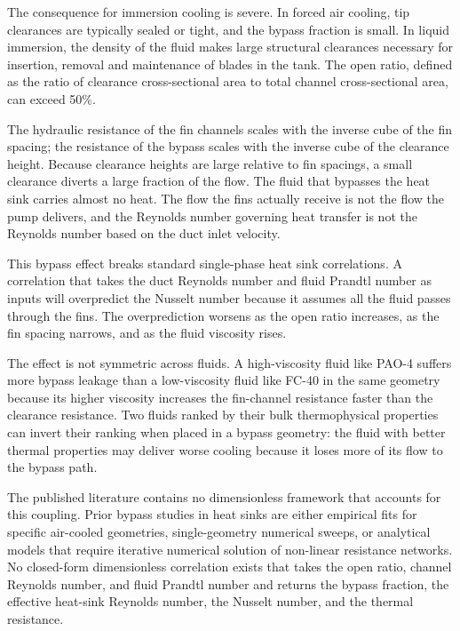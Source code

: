 \documentclass[preprint,12pt]{elsarticle}
\begin{document}
The consequence for immersion cooling is severe. In forced air cooling, tip clearances are
typically sealed or tight, and the bypass fraction is small. In liquid immersion, the density of
the fluid makes large structural clearances necessary for insertion, removal and maintenance of
blades in the tank. The open ratio, defined as the ratio of clearance cross-sectional area to
total channel cross-sectional area, can exceed 50\%.

The hydraulic resistance of the fin channels scales with the inverse cube of the fin spacing;
the resistance of the bypass scales with the inverse cube of the clearance height. Because
clearance heights are large relative to fin spacings, a small clearance diverts a large fraction
of the flow. The fluid that bypasses the heat sink carries almost no heat. The flow the fins
actually receive is not the flow the pump delivers, and the Reynolds number governing heat
transfer is not the Reynolds number based on the duct inlet velocity.

This bypass effect breaks standard single-phase heat sink correlations. A correlation that
takes the duct Reynolds number and fluid Prandtl number as inputs will overpredict the Nusselt
number because it assumes all the fluid passes through the fins. The overprediction worsens as
the open ratio increases, as the fin spacing narrows, and as the fluid viscosity rises.

The effect is not symmetric across fluids. A high-viscosity fluid like PAO-4 suffers more
bypass leakage than a low-viscosity fluid like FC-40 in the same geometry because its higher
viscosity increases the fin-channel resistance faster than the clearance resistance. Two fluids
ranked by their bulk thermophysical properties can invert their ranking when placed in a bypass
geometry: the fluid with better thermal properties may deliver worse cooling because it loses
more of its flow to the bypass path.

The published literature contains no dimensionless framework that accounts for this coupling.
Prior bypass studies in heat sinks are either empirical fits for specific air-cooled geometries,
single-geometry numerical sweeps, or analytical models that require iterative numerical solution
of non-linear resistance networks. No closed-form dimensionless correlation exists that takes
the open ratio, channel Reynolds number, and fluid Prandtl number and returns the bypass fraction,
the effective heat-sink Reynolds number, the Nusselt number, and the thermal resistance.
\end{document}
